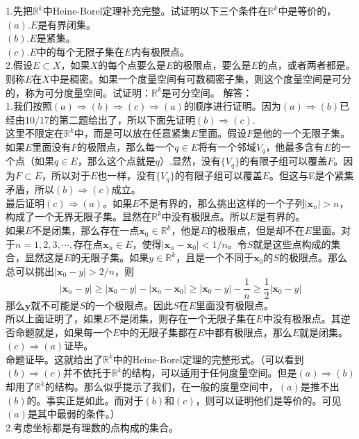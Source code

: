 \documentclass[11pt,a4paper,openany]{article} \usepackage{amssymb,amsfonts, amsmath,ctex,bm}
\begin{document}
\noindent 1.先把$\mathbb{R}^k$中Heine-Borel定理补充完整。试证明以下三个条件在$\mathbb{R}^k$中是等价的，\\
$(a)$.$E$是有界闭集。\\
$(b)$.$E$是紧集。\\
$(c)$.$E$中的每个无限子集在$E$内有极限点。\\
2.假设$E\subset X$，如果$X$的每个点要么是$E$的极限点，要么是$E$的点，或者两者都是。则称$E$在$X$中是稠密。如果一个度量空间有可数稠密子集，则这个度量空间是可分的，称为可分度量空间。试证明：$\mathbb{R}^k$是可分空间。
\newpage
解答：\\
1.我们按照$(a)\Rightarrow (b)\Rightarrow (c)\Rightarrow (a)$的顺序进行证明。因为$(a)\Rightarrow (b)$已经由10/17的第二题给出了，所以下面先证明$(b)\Rightarrow (c)$.\\
\indent 这里不限定在$\mathbb{R}^k$中，而是可以放在任意紧集$E$里面。假设$F$是他的一个无限子集。如果$E$里面没有$F$的极限点，那么每一个$q\in E$将有一个邻域$V_q$，他最多含有$E$的一个点（如果$q\in E$，那么这个点就是$q$）.显然，没有$\{V_q\}$的有限子组可以覆盖$F$。因为$F\subset E$，所以对于$E$也一样，没有$\{V_q\}$的有限子组可以覆盖$E$。但这与E是个紧集矛盾，所以$(b)\Rightarrow (c)$成立。\\
\indent 最后证明$(c)\Rightarrow (a)$。如果$E$不是有界的，那么挑出这样的一个子列$|\bm{x}_n|>n$，构成了一个无界无限子集。显然在$\mathbb{R}^k$中没有极限点。所以$E$是有界的。\\
\indent 如果$E$不是闭集，那么存在一点$\bm{x}_0 \in \mathbb{R}^k$，他是$E$的极限点，但是却不在$E$里面。对于$n=1,2,3,\cdots,$存在点$\bm{x}_n \in E$，使得$|\bm{x}_n-\bm{x}_0|<1/n$。令$S$就是这些点构成的集合，显然这是$E$的无限子集。如果$y \in \mathbb{R}^k$，且是一个不同于$\bm{x}_0$的$S$的极限点。那么总可以挑出$|\bm{x}_0-y|>2/n$，则
\[
|\bm{x}_n-y|\geq |\bm{x}_0-y|-|\bm{x}_n-\bm{x}_0|\geq |\bm{x}_0-y|-\frac{1}{n}\geq \frac{1}{2}|\bm{x}_0-y|
\]
那么$\bm y$就不可能是$S$的一个极限点。因此$S$在$E$里面没有极限点。\\
\indent 所以上面证明了，如果$E$不是闭集，则存在一个无限子集在$E$中没有极限点。其逆否命题就是，如果每一个$E$中的无限子集都在$E$中都有极限点，那么$E$就是闭集。$(c)\Rightarrow (a)$证毕。\\
\indent 命题证毕。这就给出了$\mathbb{R}^k$中的Heine-Borel定理的完整形式。（可以看到$(b)\Rightarrow (c)$并不依托于$\mathbb{R}^k$的结构，可以适用于任何度量空间。但是$(a)\Rightarrow (b)$却用了$\mathbb{R}^k$的结构。那么似乎提示了我们，在一般的度量空间中，$(a)$是推不出$(b)$的。事实正是如此。而对于$(b)$和$(c)$，则可以证明他们是等价的。可见$(a)$是其中最弱的条件。）\\
2.考虑坐标都是有理数的点构成的集合。
\end{document}
